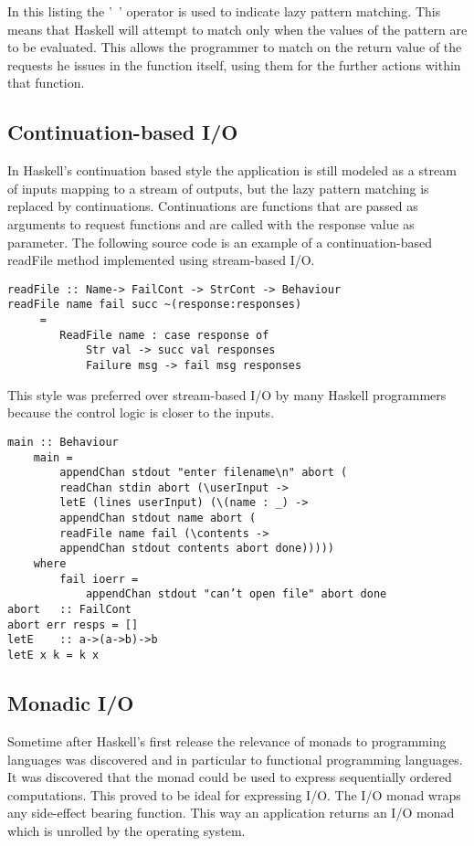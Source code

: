 In this listing the '~' operator is used to indicate lazy pattern matching. This means that Haskell will attempt to match only when the values of the pattern are to be evaluated. This allows the programmer to match on the return value of the requests he issues in the function itself, using them for the further actions within that function.

\subsection{Continuation-based I/O}
In Haskell's continuation based style the application is still modeled as a stream of inputs mapping to a stream of outputs, but the lazy pattern matching is replaced by continuations. Continuations are functions that are passed as arguments to request functions and are called with the response value as parameter. The following source code is an example of a continuation-based readFile method implemented using stream-based I/O.

\begin{lstlisting}[caption={Definition of readFile in continuation-based I/O in Haskell}]
readFile :: Name-> FailCont -> StrCont -> Behaviour
readFile name fail succ ~(response:responses)
	 =
		ReadFile name : case response of
			Str val -> succ val responses
			Failure msg -> fail msg responses
\end{lstlisting}

This style was preferred over stream-based I/O by many Haskell programmers because the control logic is closer to the inputs.

\begin{lstlisting}[caption={Example of continuation-based I/O in Haskell}]
main :: Behaviour
	main =
 		appendChan stdout "enter filename\n" abort (
		readChan stdin abort (\userInput ->
		letE (lines userInput) (\(name : _) ->
		appendChan stdout name abort (
		readFile name fail (\contents ->
		appendChan stdout contents abort done)))))
	where
		fail ioerr =
			appendChan stdout "can’t open file" abort done
abort	:: FailCont
abort err resps = []
letE	:: a->(a->b)->b
letE x k = k x
\end{lstlisting}

\subsection{Monadic I/O}
Sometime after Haskell's first release the relevance of monads to programming languages was discovered and in particular to functional programming languages. It was discovered that the monad could be used to express sequentially ordered computations. This proved to be ideal for expressing I/O. The I/O monad wraps any side-effect bearing function. This way an application returns an I/O monad which is unrolled by the operating system.

